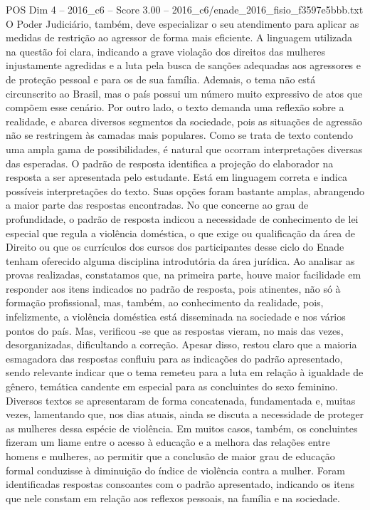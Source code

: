 \begin{textsample}{POS Dim 4 – 2016\_c6 – Score 3.00 – 2016\_c6/enade\_2016\_fisio\_f3597e5bbb.txt}
O Poder Judiciário, também, deve especializar o seu atendimento para aplicar as medidas de restrição ao agressor de forma mais eficiente.
A linguagem utilizada na questão foi clara, indicando a grave violação dos direitos das mulheres injustamente agredidas e a luta pela busca de sanções adequadas aos agressores e de proteção pessoal e para os de sua família.
Ademais, o tema não está circunscrito ao Brasil, mas o país possui um número muito expressivo de atos que compõem esse cenário.
Por outro lado, o texto demanda uma reflexão sobre a realidade, e abarca diversos segmentos da sociedade, pois as situações de agressão não se restringem às camadas mais populares.
Como se trata de texto contendo uma ampla gama de possibilidades, é natural que ocorram interpretações diversas das esperadas.
O padrão de resposta identifica a projeção do elaborador na resposta a ser apresentada pelo estudante.
Está em linguagem correta e indica possíveis interpretações do texto.
Suas opções foram bastante amplas, abrangendo a maior parte das respostas encontradas.
No que concerne ao grau de profundidade, o padrão de resposta indicou a necessidade de conhecimento de lei especial que regula a violência doméstica, o que exige ou qualificação da área de Direito ou que os currículos dos cursos dos participantes desse ciclo do Enade tenham oferecido alguma disciplina introdutória da área jurídica.
Ao analisar as provas realizadas, constatamos que, na primeira parte, houve maior facilidade em responder aos itens indicados no padrão de resposta, pois atinentes, não só à formação profissional, mas, também, ao conhecimento da realidade, pois, infelizmente, a violência doméstica está disseminada na sociedade e nos vários pontos do país.
Mas, verificou -se que as respostas vieram, no mais das vezes, desorganizadas, dificultando a correção.
Apesar disso, restou claro que a maioria esmagadora das respostas confluiu para as indicações do padrão apresentado, sendo relevante indicar que o tema remeteu para a luta em relação à igualdade de gênero, temática candente em especial para as concluintes do sexo feminino.
Diversos textos se apresentaram de forma concatenada, fundamentada e, muitas vezes, lamentando que, nos dias atuais, ainda se discuta a necessidade de proteger as mulheres dessa espécie de violência.
Em muitos casos, também, os concluintes fizeram um liame entre o acesso à educação e a melhora das relações entre homens e mulheres, ao permitir que a conclusão de maior grau de educação formal conduzisse à diminuição do índice de violência contra a mulher.
Foram identificadas respostas consoantes com o padrão apresentado, indicando os itens que nele constam em relação aos reflexos pessoais, na família e na sociedade.

\end{textsample}
